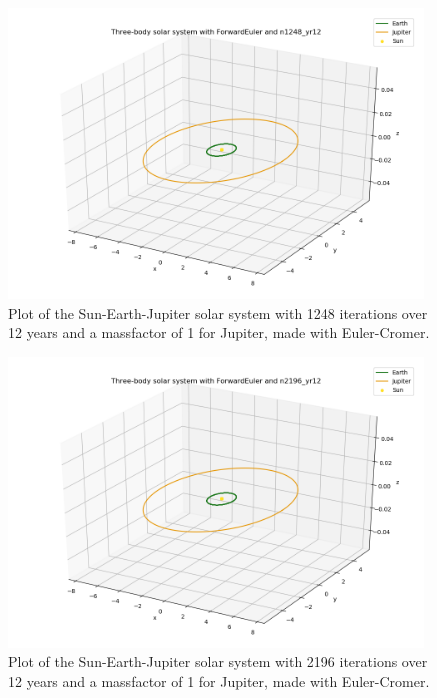 \documentclass{article}
\begin{document}
    \begin{figure}[H]
        \centering
        \includegraphics[width = 11cm]{img/plot3D_S_E_J_F_n1248_yr12.png}
        \caption{Plot of the Sun-Earth-Jupiter solar system with 1248 iterations over 12 years and a massfactor of 1 for Jupiter, made with Euler-Cromer.}
        \label{fig:plot3D_S_E_J_F_n1248_yr12}
    \end{figure}

    \begin{figure}[H]
        \centering
        \includegraphics[width = 11cm]{img/plot3D_S_E_J_F_n2196_yr12.png}
        \caption{Plot of the Sun-Earth-Jupiter solar system with 2196 iterations over 12 years and a massfactor of 1 for Jupiter, made with Euler-Cromer.}
        \label{fig:plot3D_S_E_J_F_n2196_yr12}
    \end{figure}
\end{document}
